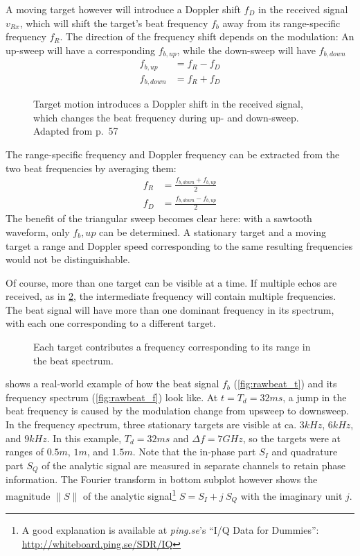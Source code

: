 A moving target however will introduce a Doppler shift \(f_D\) in the
received signal \(v_{Rx}\), which will shift the target's beat frequency
\(f_b\) away from its range-specific frequency \(f_R\). The direction of
the frequency shift depends on the modulation: An up-sweep will have a
corresponding $f_{b,up}$, while the down-sweep will have $f_{b,down}$
\begin{align*}
	f_{b,up}    &= f_R - f_D \\
	f_{b,down}  &= f_R + f_D
\end{align*}

\begin{figure}[htp]
    \centering
    \def\svgwidth{10cm}
    
    \caption{\label{fig:fmcw_doppler}Target motion introduces a Doppler shift in the received signal, which changes the beat frequency during up- and down-sweep. Adapted from \cite{Adams2012} p.~57}
\end{figure}

The range-specific frequency and Doppler frequency can be extracted from the two beat frequencies by averaging them: 
\begin{align*}
	f_R &= \frac{f_{b,down} + f_{b,up}}{2} \\
    f_D &= \frac{f_{b,down} - f_{b,up}}{2}
\end{align*}
The benefit of the triangular sweep becomes clear here: with a sawtooth
waveform, only \(f_b,up\) can be determined. A stationary target and a
moving target a range and Doppler speed corresponding to the same
resulting frequencies would not be distinguishable.

Of course, more than one target can be visible at a time. If multiple
echos are received, as in \cref{fig:fmcw_multitarget}, the intermediate frequency will
contain multiple frequencies. The beat signal will have more than one
dominant frequency in its spectrum, with each one corresponding to a
different target.

\begin{figure}[htp]
    \centering
    \def\svgwidth{10cm}
    
    \caption{\label{fig:fmcw_multitarget}Each target contributes a frequency corresponding to its range in the beat spectrum.}
\end{figure}

 shows a real-world example of how the beat signal \(f_b\)
(\cref{fig:rawbeat_t}) and its frequency spectrum (\cref{fig:rawbeat_f}) look like. At
\(t=T_d=32ms\), a jump in the beat frequency is caused by the modulation
change from upsweep to downsweep. In the frequency spectrum, three
stationary targets are visible at ca. \(3kHz\), \(6kHz\), and \(9kHz\).
In this example, \(T_d=32ms\) and \(\Delta f=7GHz\), so the targets were
at ranges of \(0.5m\), \(1m\), and \(1.5m\). Note that the in-phase part
\(S_I\) and quadrature part \(S_Q\) of the analytic signal are measured
in separate channels to retain phase information. The Fourier transform
in bottom subplot however shows the magnitude \(\|S\|\) of the analytic
signal\footnote{A good explanation is available at \textit{ping.se}'s ``I/Q Data for Dummies'': \url{http://whiteboard.ping.se/SDR/IQ}}
\(S = S_I + j~S_Q\) with the imaginary unit \(j\).

